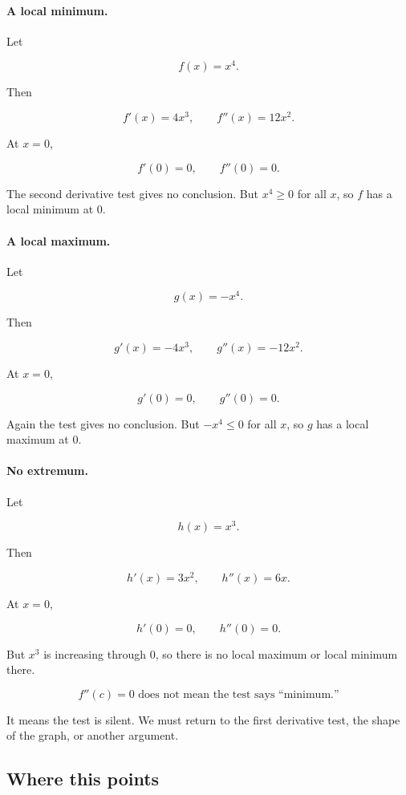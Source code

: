 \paragraph{A local minimum.}
Let

\[
f(x)=x^4.
\]

Then

\[
f'(x)=4x^3,
\qquad
f''(x)=12x^2.
\]

At \(x=0\),

\[
f'(0)=0,
\qquad
f''(0)=0.
\]

The second derivative test gives no conclusion.  But \(x^4\ge0\) for all \(x\), so
\(f\) has a local minimum at \(0\).

\paragraph{A local maximum.}
Let

\[
g(x)=-x^4.
\]

Then

\[
g'(x)=-4x^3,
\qquad
g''(x)=-12x^2.
\]

At \(x=0\),

\[
g'(0)=0,
\qquad
g''(0)=0.
\]

Again the test gives no conclusion.  But \(-x^4\le0\) for all \(x\), so \(g\) has a
local maximum at \(0\).

\paragraph{No extremum.}
Let

\[
h(x)=x^3.
\]

Then

\[
h'(x)=3x^2,
\qquad
h''(x)=6x.
\]

At \(x=0\),

\[
h'(0)=0,
\qquad
h''(0)=0.
\]

But \(x^3\) is increasing through \(0\), so there is no local maximum or local
minimum there.

\[
\boxed{
f''(c)=0 \text{ does not mean the test says ``minimum.''}
}
\]

It means the test is silent.  We must return to the first derivative test, the shape of
the graph, or another argument.

\subsection{Where this points}
\label{subsec:concavity-hook-graph-sketching}

